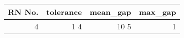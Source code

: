 \begin{tabular}{rrrr}
\toprule
RN No. & tolerance & mean_gap & max_gap \\
\midrule
4 & 1%
4 & 10%
5 & 1%
\bottomrule
\end{tabular}
